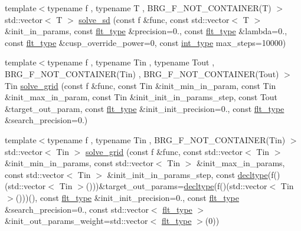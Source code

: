 \begin{DoxyCompactItemize}
\item 
{\footnotesize template$<$typename f , typename T , B\-R\-G\-\_\-\-F\-\_\-\-N\-O\-T\-\_\-\-C\-O\-N\-T\-A\-I\-N\-E\-R(\-T) $>$ }\\std\-::vector$<$ T $>$ \hyperlink{namespaceIceBRG_ae7b3a2eee0410a3273377df6ad8c6fa6}{solve\-\_\-sd} (const f \&func, const std\-::vector$<$ T $>$ \&init\-\_\-in\-\_\-params, const \hyperlink{lib_2IceBRG__main_2common_8h_ad0f130a56eeb944d9ef2692ee881ecc4}{flt\-\_\-type} \&precision=0., const \hyperlink{lib_2IceBRG__main_2common_8h_ad0f130a56eeb944d9ef2692ee881ecc4}{flt\-\_\-type} \&lambda=0., const \hyperlink{lib_2IceBRG__main_2common_8h_ad0f130a56eeb944d9ef2692ee881ecc4}{flt\-\_\-type} \&cusp\-\_\-override\-\_\-power=0, const \hyperlink{lib_2IceBRG__main_2common_8h_ac4de9d9335536ac22821171deec8d39e}{int\-\_\-type} max\-\_\-steps=10000)
\item 
{\footnotesize template$<$typename f , typename Tin , typename Tout , B\-R\-G\-\_\-\-F\-\_\-\-N\-O\-T\-\_\-\-C\-O\-N\-T\-A\-I\-N\-E\-R(\-Tin) , B\-R\-G\-\_\-\-F\-\_\-\-N\-O\-T\-\_\-\-C\-O\-N\-T\-A\-I\-N\-E\-R(\-Tout) $>$ }\\Tin \hyperlink{namespaceIceBRG_a2e57f2ccc8ea554486782ec73f24cec3}{solve\-\_\-grid} (const f \&func, const Tin \&init\-\_\-min\-\_\-in\-\_\-param, const Tin \&init\-\_\-max\-\_\-in\-\_\-param, const Tin \&init\-\_\-init\-\_\-in\-\_\-params\-\_\-step, const Tout \&target\-\_\-out\-\_\-param, const \hyperlink{lib_2IceBRG__main_2common_8h_ad0f130a56eeb944d9ef2692ee881ecc4}{flt\-\_\-type} \&init\-\_\-init\-\_\-precision=0., const \hyperlink{lib_2IceBRG__main_2common_8h_ad0f130a56eeb944d9ef2692ee881ecc4}{flt\-\_\-type} \&search\-\_\-precision=0.)
\item 
{\footnotesize template$<$typename f , typename Tin , B\-R\-G\-\_\-\-F\-\_\-\-N\-O\-T\-\_\-\-C\-O\-N\-T\-A\-I\-N\-E\-R(\-Tin) $>$ }\\std\-::vector$<$ Tin $>$ \hyperlink{namespaceIceBRG_ace50e9ed28a4b15e0cffb9322e8c0ff8}{solve\-\_\-grid} (const f \&func, const std\-::vector$<$ Tin $>$ \&init\-\_\-min\-\_\-in\-\_\-params, const std\-::vector$<$ Tin $>$ \&init\-\_\-max\-\_\-in\-\_\-params, const std\-::vector$<$ Tin $>$ \&init\-\_\-init\-\_\-in\-\_\-params\-\_\-step, const \hyperlink{namespaceIceBRG_a528e5024ecab03049320529180ae84a8}{decltype}(f()(std\-::vector$<$ Tin $>$()))\&target\-\_\-out\-\_\-params=\hyperlink{namespaceIceBRG_a528e5024ecab03049320529180ae84a8}{decltype}(f()(std\-::vector$<$ Tin $>$()))(), const \hyperlink{lib_2IceBRG__main_2common_8h_ad0f130a56eeb944d9ef2692ee881ecc4}{flt\-\_\-type} \&init\-\_\-init\-\_\-precision=0., const \hyperlink{lib_2IceBRG__main_2common_8h_ad0f130a56eeb944d9ef2692ee881ecc4}{flt\-\_\-type} \&search\-\_\-precision=0., const std\-::vector$<$ \hyperlink{lib_2IceBRG__main_2common_8h_ad0f130a56eeb944d9ef2692ee881ecc4}{flt\-\_\-type} $>$ \&init\-\_\-out\-\_\-params\-\_\-weight=std\-::vector$<$ \hyperlink{lib_2IceBRG__main_2common_8h_ad0f130a56eeb944d9ef2692ee881ecc4}{flt\-\_\-type} $>$(0))

\end{DoxyCompactItemize}
